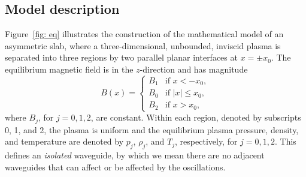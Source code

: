 \subsection{Model description}
Figure~\ref{fig: eq} illustrates the construction of the mathematical model of an asymmetric slab, where a three-dimensional, unbounded, inviscid plasma is separated into three regions by two parallel planar interfaces at $x = \pm x_0$. The equilibrium magnetic field is in the $z$-direction and has magnitude
\begin{equation}
	B(x)=
	\begin{cases}
		B_1 & \text{if } x < -x_0, \\
		B_0 & \text{if } |x|\leq{x_0}, \\
		B_2 & \text{if } x > x_0,
	\end{cases}
\end{equation}
where $B_j$, for $j = 0, 1, 2$, are constant. Within each region, denoted by subscripts 0, 1, and 2, the plasma is uniform and the equilibrium plasma pressure, density, and temperature are denoted by $p_j$, $\rho_j$, and $T_j$, respectively, for $j = 0, 1, 2$. This defines an \textit{isolated} waveguide, by which we mean there are no adjacent waveguides that can affect or be affected by the oscillations.

